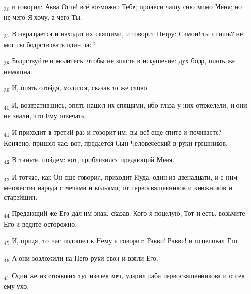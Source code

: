 \begin{tcolorbox}
\textsubscript{36} и говорил: Авва Отче! всё возможно Тебе; пронеси чашу сию мимо Меня; но не чего Я хочу, а чего Ты.
\end{tcolorbox}
\begin{tcolorbox}
\textsubscript{37} Возвращается и находит их спящими, и говорит Петру: Симон! ты спишь? не мог ты бодрствовать один час?
\end{tcolorbox}
\begin{tcolorbox}
\textsubscript{38} Бодрствуйте и молитесь, чтобы не впасть в искушение: дух бодр, плоть же немощна.
\end{tcolorbox}
\begin{tcolorbox}
\textsubscript{39} И, опять отойдя, молился, сказав то же слово.
\end{tcolorbox}
\begin{tcolorbox}
\textsubscript{40} И, возвратившись, опять нашел их спящими, ибо глаза у них отяжелели, и они не знали, что Ему отвечать.
\end{tcolorbox}
\begin{tcolorbox}
\textsubscript{41} И приходит в третий раз и говорит им: вы всё еще спите и почиваете? Кончено, пришел час: вот, предается Сын Человеческий в руки грешников.
\end{tcolorbox}
\begin{tcolorbox}
\textsubscript{42} Встаньте, пойдем; вот, приблизился предающий Меня.
\end{tcolorbox}
\begin{tcolorbox}
\textsubscript{43} И тотчас, как Он еще говорил, приходит Иуда, один из двенадцати, и с ним множество народа с мечами и кольями, от первосвященников и книжников и старейшин.
\end{tcolorbox}
\begin{tcolorbox}
\textsubscript{44} Предающий же Его дал им знак, сказав: Кого я поцелую, Тот и есть, возьмите Его и ведите осторожно.
\end{tcolorbox}
\begin{tcolorbox}
\textsubscript{45} И, придя, тотчас подошел к Нему и говорит: Равви! Равви! и поцеловал Его.
\end{tcolorbox}
\begin{tcolorbox}
\textsubscript{46} А они возложили на Него руки свои и взяли Его.
\end{tcolorbox}
\begin{tcolorbox}
\textsubscript{47} Один же из стоявших тут извлек меч, ударил раба первосвященникова и отсек ему ухо.
\end{tcolorbox}
